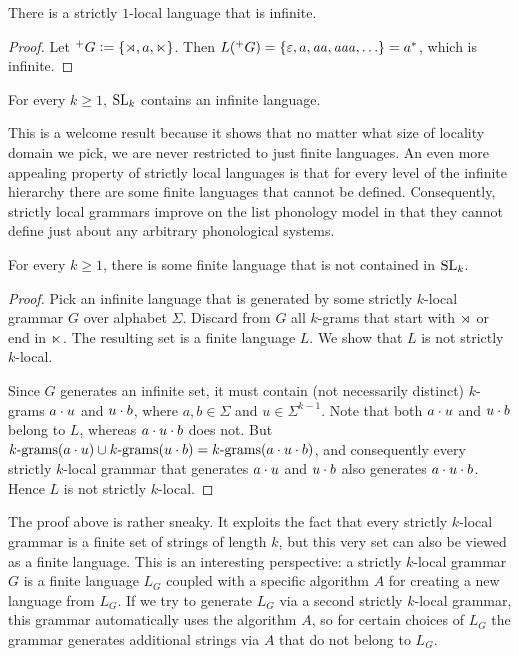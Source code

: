 %
\begin{lemma}
    There is a strictly $1$-local language that is infinite.
\end{lemma}
%
\begin{proof}
    Let $\posG{G} \is \setof{\LeftEdge, a, \RightEdge}$.
    Then $L(\posG{G}) = \setof{\emptystring, a, \String{aa}, \String{aaa}, \ldots} = a^*$, which is infinite.
\end{proof}
%
\begin{corollary}
    For every $k \geq 1$, $\SL_k$ contains an infinite language.
\end{corollary}
%
This is a welcome result because it shows that no matter what size of locality domain we pick, we are never restricted to just finite languages.
An even more appealing property of strictly local languages is that for every level of the infinite hierarchy there are some finite languages that cannot be defined.
Consequently, strictly local grammars improve on the list phonology model in that they cannot define just about any arbitrary phonological systems.
%
\begin{theorem}
    For every $k \geq 1$, there is some finite language that is not contained in $\SL_k$. 
\end{theorem}
%
\begin{proof}
    Pick an infinite language that is generated by some strictly $k$-local grammar $G$ over alphabet $\Sigma$.
    Discard from $G$ all $k$-grams that start with $\LeftEdge$ or end in $\RightEdge$.
    The resulting set is a finite language $L$.
    We show that $L$ is not strictly $k$-local.

    Since $G$ generates an infinite set, it must contain (not necessarily distinct) $k$-grams $a \stringcat u$ and $u \stringcat b$, where $a,b \in \Sigma$ and $u \in \Sigma^{k-1}$.
    Note that both $a \stringcat u$ and $u \stringcat b$ belong to $L$, whereas $a \stringcat u \stringcat b$ does not.
    But $\Bigrams[k](a \stringcat u) \cup \Bigrams[k](u \stringcat b) = \Bigrams[k](a \stringcat u \stringcat b)$, and consequently every strictly $k$-local grammar that generates $a \stringcat u$ and $u \stringcat b$ also generates $a \stringcat u \stringcat b$.
    Hence $L$ is not strictly $k$-local.
\end{proof}
%
The proof above is rather sneaky.
It exploits the fact that every strictly $k$-local grammar is a finite set of strings of length $k$, but this very set can also be viewed as a finite language.
This is an interesting perspective: a strictly $k$-local grammar $G$ is a finite language $L_G$ coupled with a specific algorithm $A$ for creating a new language from $L_G$.
If we try to generate $L_G$ via a second strictly $k$-local grammar, this grammar automatically uses the algorithm $A$, so for certain choices of $L_G$ the grammar generates additional strings via $A$ that do not belong to $L_G$.

